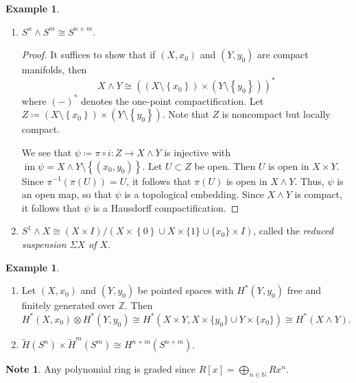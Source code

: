 \documentclass[10pt,letterpaper,cm]{nupset}
\theoremstyle{definition}
\newtheorem{exmp}[definition]{Example}
\newtheorem{note}[definition]{Note}
\theoremstyle{theorem}
\theoremstyle{remark}
\newcommand{\N}{\mathbb N}
\newcommand{\Z}{\mathbb Z}
\newcommand{\1}{\mathbb{1}}
\newcommand{\0}{\vec 0}
\DeclareMathOperator{\im}{im}
\begin{document}
\begin{exmp} $ $
\begin{enumerate}
\item $S^n \wedge  S^m \cong S^{n+m}$.
\begin{proof}
 It suffices to show that if $\left(X, x_0\right)$ and $\left(Y, y_0\right)$ are compact manifolds, then $$X \wedge Y \cong \left(\left(X \setminus \left\{x_0\right\}\right) \times \left(Y \setminus \left\{y_0\right\}\right)\right)^{\ast}$$ where $\left({-}\right)^{\ast}$ denotes the one-point compactification. Let $Z\coloneqq  \left(X \setminus \left\{x_0\right\}\right) \times \left(Y \setminus \left\{y_0\right\}\right)$. Note that $Z$ is noncompact but locally compact. 
 
 We see that $\psi \coloneqq  \pi \circ i : Z \to X \wedge Y$ is injective with $\im{\psi} = X \wedge Y \setminus \left\{\left(x_0, y_0\right)\right\}$. Let $U \subset Z$ be open. Then $U$ is open in $X \times Y$.  Since $\pi^{-1}(\pi(U)) = U$, it follows that $\pi(U)$ is open in $X \wedge Y$. Thus, $\psi$ is an open map, so that $\psi$ is a topological embedding. Since $X \wedge Y$ is compact, it follows that $\psi$ is a Hausdorff compactification. 
\end{proof}
\item $S^1 \wedge X \cong \left(X\times I\right)/\left(X\times \left\{0\right\}\cup X\times \{1\}\cup \{x_{0}\}\times I\right)$, called the \textit{reduced suspension $\Sigma{X}$ of $X$}.
\end{enumerate}
\end{exmp}

\begin{exmp} $ $
\begin{enumerate}
\item Let $\left(X, x_0\right)$ and $\left(Y, y_0\right)$ be pointed spaces with $H^{\ast}\left(Y, y_0\right)$ free and finitely generated over $\Z$. Then $H^{\ast}\left(X, x_0\right) \otimes H^{\ast}\left(Y, y_0\right) \cong H^{\ast}(X \times Y, X \times \{y_0\} \cup Y \times \{x_0\}) \cong H^{\ast}(X \wedge Y)    .$
\item  $\widetilde{H}(S^n) \times \widetilde{H}^m(S^m) \cong H^{n+m}(S^{n+m})$.
\end{enumerate}
\end{exmp}

\bigskip

\begin{note}
Any polynomial ring is graded since $R[x] = \bigoplus_{n \in \N} Rx^n$.
\end{note}
\end{document}
